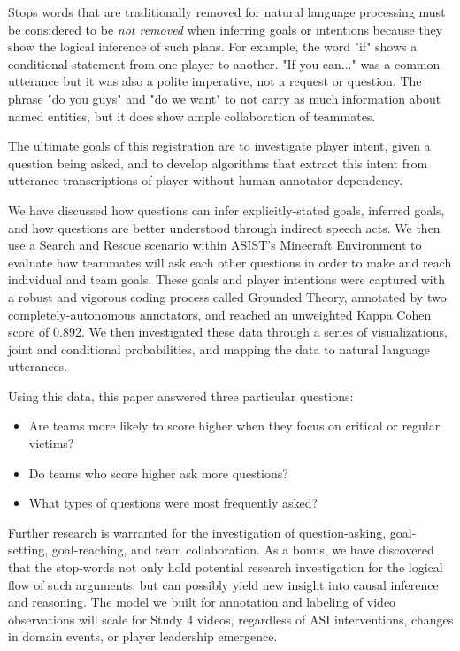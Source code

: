Stops words that are traditionally removed for natural language processing must be considered to be \emph{not removed} when inferring goals or intentions because they show the logical inference of such plans. For example, the word "if" shows a conditional statement from one player to another. "If you can..." was a common utterance but it was also a polite imperative, not a request or question. The phrase "do you guys" and "do we want" to not carry as much information about named entities, but it does show ample collaboration of teammates.

The ultimate goals of this registration are to investigate player intent, given a question being asked, and 
to develop algorithms that extract this
intent from utterance transcriptions of player without human annotator
dependency. 

We have discussed how questions can infer explicitly-stated goals, inferred goals, and how questions are better understood through indirect speech acts. We then use a Search and Rescue scenario within ASIST's Minecraft Environment to evaluate how teammates will ask each other questions in order to make and reach individual and team goals. These goals and player intentions were captured with a robust and vigorous coding process called Grounded Theory, annotated by two completely-autonomous annotators, and reached an unweighted Kappa Cohen score of 0.892. We then investigated these data through a series of visualizations, joint and conditional probabilities, and mapping the data to natural language utterances. 

Using this data, this paper answered three particular questions:
\begin{itemize}
    \item Are teams more likely to score higher when they focus on critical or regular victims?
    \item Do teams who score higher ask more questions?
    \item What types of questions were most frequently asked?
 \end{itemize}

Further research is warranted for the investigation of question-asking, goal-setting, goal-reaching, and team collaboration. As a bonus, we have discovered that the stop-words not only hold potential research investigation for the logical flow of such arguments, but can possibly yield new insight into causal inference and reasoning. The model we built for annotation and labeling of video observations will scale for Study 4 videos, regardless of ASI interventions, changes in domain events, or player leadership emergence.




